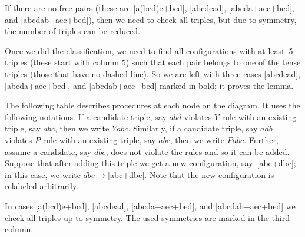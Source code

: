 \documentclass{article}
\begin{document}
If there are no free pairs (these are \ref{a(bcd)e+bcd}, \ref{abcdead}, \ref{abcda+aec+bed}, and \ref{abcdab+aec+bed}),
then we need to check all triples,
but due to symmetry, the number of triples can be reduced.

Once we did the classification, we need to find all configurations with at least~5 triples (these start with column 5)
such that each pair belongs to one of the tense triples (those that have no dashed line).
So we are left with three cases \ref{abcdead}, \ref{abcda+aec+bed}, and \ref{abcdab+aec+bed} marked in bold;
it proves the lemma.

The following table describes procedures at each node on the diagram.
It uses the following notations.
If a candidate triple, say $abd$ violates $Y$ rule with an existing triple, say $abc$, then we write $Yabc$.
Similarly, if a candidate triple, say $adb$ violates $P$ rule with an existing triple, say $abc$, then we write $Pabc$.
Further, assume a candidate, say $dbe$, does not violate the rules and so it can be added.
Suppose that after adding this triple we get a new configuration, say~\ref{abc+dbe};
in this case, we write $dbe{\to}$\ref{abc+dbe}.
Note that the new configuration is relabeled arbitrarily.

In cases \ref{a(bcd)e+bcd}, \ref{abcdead}, \ref{abcda+aec+bed}, and \ref{abcdab+aec+bed} we check all triples up to symmetry.
The used symmetries are marked in the third column.


\setcounter{foo}{0}
\newcommand{\myitem}{\refstepcounter{foo}\thefoo}
\end{document}
